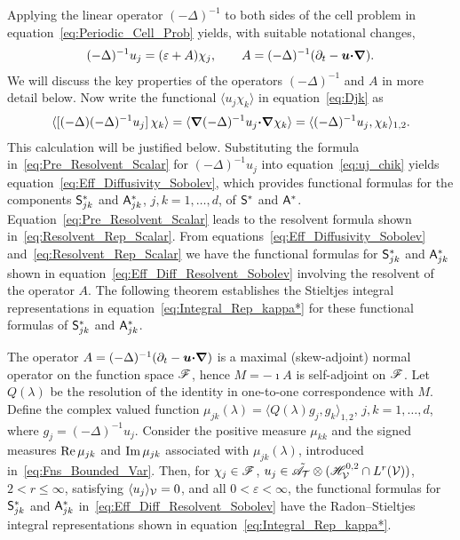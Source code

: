 \documentclass[amsa]{ipart}
\begin{document}
Applying the linear operator $(-\Delta)^{-1}$ to both sides of the cell
problem in equation~\eqref{eq:Periodic_Cell_Prob} yields, with
suitable notational changes,
%
\begin{align}\label{eq:Pre_Resolvent_Scalar}
  (-\Delta)^{-1}u_j=(\varepsilon+A)\chi_j,
  \qquad
  A=(-\Delta)^{-1}(\partial_t-\vecu \bcdot\bnabla).
\end{align}
%
We will discuss the key properties of the operators $(-\Delta)^{-1}$ and
$A$ in more detail below.  Now write the functional $\langle u_j\chi_k\rangle$ in 
equation~\eqref{eq:Djk} as~\cite{Pavliotis:PHD_Thesis}       
%
\begin{align}\label{eq:uj_chik}
  \langle[(-\Delta)(-\Delta)^{-1}u_j]\,\chi_k\rangle
       =\langle\bnabla(-\Delta)^{-1}u_j\bcdot\bnabla \chi_k\rangle
       =\langle(-\Delta)^{-1}u_j,\chi_k\rangle_{1,2}.
\end{align}
%
This calculation will be justified below. Substituting the  
formula in~\eqref{eq:Pre_Resolvent_Scalar} for $(-\Delta)^{-1}u_j$ 
into equation~\eqref{eq:uj_chik} yields
equation~\eqref{eq:Eff_Diffusivity_Sobolev}, which provides functional
formulas for the components
$\mathsf{S}^*_{jk}$ and $\mathsf{A}^*_{jk}$, $j,k=1,\ldots,d$, of $\mathsf{S}^*$ and $\mathsf{A}^*$.
Equation~\eqref{eq:Pre_Resolvent_Scalar}   
leads to the resolvent formula shown
in~\eqref{eq:Resolvent_Rep_Scalar}.  
From equations~\eqref{eq:Eff_Diffusivity_Sobolev}
and~\eqref{eq:Resolvent_Rep_Scalar} we have the functional formulas
for $\mathsf{S}^*_{jk}$ and $\mathsf{A}^*_{jk}$ shown in 
equation~\eqref{eq:Eff_Diff_Resolvent_Sobolev} involving the resolvent
of the operator $A$. The following theorem establishes the 
Stieltjes integral representations in
equation~\eqref{eq:Integral_Rep_kappa*} for these functional formulas
of $\mathsf{S}^*_{jk}$ and $\mathsf{A}^*_{jk}$.  



%
\begin{theorem}\label{thm:Integral_Reps}
  The operator $A=(-\Delta)^{-1}(\partial_t-\boldsymbol{u}\mbox{\boldmath${\cdot}$}\mbox{\boldmath${\nabla}$})$ is a maximal
  (skew-adjoint) normal operator on the function space $\mathscr{F}$, hence
  $M=-\imath A$ is self-adjoint on $\mathscr{F}$. Let $Q(\lambda)$ be the resolution of
  the identity in one-to-one correspondence with $M$. Define the
  complex valued function $\mu_{jk}(\lambda)=\langle Q(\lambda)g_j,g_k\rangle_{1,2}$,
  $j,k=1,\ldots,d$, where $g_j=(-\Delta)^{-1}u_j$. Consider the positive measure
  $\mu_{kk}$ and the signed measures $\mbox{Re}\,\mu_{jk}$ and $\mbox{Im}\,\mu_{jk}$
  associated with $\mu_{jk}(\lambda)$, introduced
  in~\eqref{eq:Fns_Bounded_Var}.  Then, for $\chi_j\in\mathscr{F}$,
  $u_j\in\tilde{\mathscr{A}}_{\mathcal{T}}\otimes (\mathscr{H}^{0,2}_{\mathcal{V}}\cap L^r(\mathcal{V}))$, $2<r\leq\infty$, satisfying
  $\langle u_j\rangle_{\mathcal{V}}=0$, and all $0<\varepsilon<\infty$, the functional formulas for $\mathsf{S}^*_{jk}$
  and $\mathsf{A}^*_{jk}$ in~\eqref{eq:Eff_Diff_Resolvent_Sobolev} have the
  Radon--Stieltjes integral representations shown in
  equation~\eqref{eq:Integral_Rep_kappa*}.     
% 
\end{theorem}
%
\end{document}
